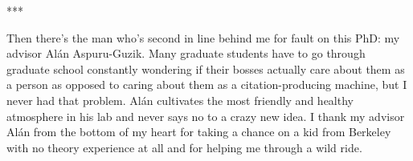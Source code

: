 \begin{center}
   ***
\end{center}


Then there's the man who's second in line behind me for fault on this PhD: my advisor Al\'an Aspuru-Guzik.  Many graduate students have to go through graduate school constantly wondering if their bosses actually care about them as a person as opposed to caring about them as a citation-producing machine, but I never had that problem.  Al\'an cultivates the most friendly and healthy atmosphere in his lab and never says no to a crazy new idea.  I thank my advisor Al\'an from the bottom of my heart for taking a chance on a kid from Berkeley with no theory experience at all and for helping me through a wild ride.
